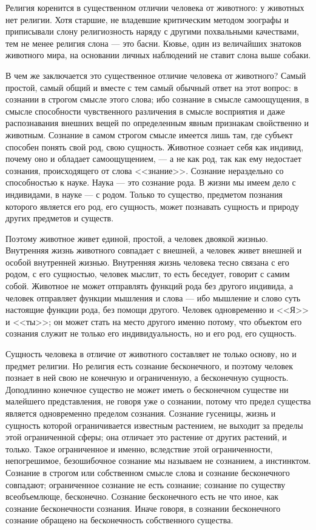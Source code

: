 \documentclass[12pt,oneside]{book}
\begin{document}
Религия коренится в существенном отличии человека от животного: у животных нет религии. Хотя старшие, не владевшие критическим методом зоографы и приписывали слону религиозность наряду с другими похвальными качествами, тем не менее религия слона --- это басни. Кювье, один из величайших знатоков животного мира, на основании личных наблюдений не ставит слона выше собаки.

В чем же заключается это существенное отличие человека от животного? Самый простой, самый общий и вместе с тем самый обычный ответ на этот вопрос: в сознании в строгом смысле этого слова; ибо сознание в смысле самоощущения, в смысле способности чувственного различения в смысле восприятия и даже распознавания внешних вещей по определенным явным признакам свойственно и животным. Сознание в самом строгом смысле имеется лишь там, где субъект способен понять свой род, свою сущность. Животное сознает себя как индивид, почему оно и обладает самоощущением, --- а не как род, так как ему недостает сознания, происходящего от слова <<знание>>. Сознание нераздельно со способностью к науке. Наука --- это сознание рода. В жизни мы имеем дело с индивидами, в науке --- с родом. Только то существо, предметом познания которого является его род, его сущность, может познавать сущность и природу других предметов и существ.

Поэтому животное живет единой, простой, а человек двоякой жизнью. Внутренняя жизнь животного совпадает с внешней, а человек живет внешней и особой внутренней жизнью. Внутренняя жизнь человека тесно связана с его родом, с его сущностью, человек мыслит, то есть беседует, говорит с самим собой. Животное не может отправлять функций рода без другого индивида, а человек отправляет функции мышления и слова --- ибо мышление и слово суть настоящие функции рода, без помощи другого. Человек одновременно и <<Я>> и <<ты>>; он может стать на место другого именно потому, что объектом его сознания служит не только его индивидуальность, но и его род, его сущность.

Сущность человека в отличие от животного составляет не только основу, но и предмет религии. Но религия есть сознание бесконечного, и поэтому человек познает в ней свою не конечную и ограниченную, а бесконечную сущность. Доподлинно конечное существо не может иметь о бесконечном существе ни малейшего представления, не говоря уже о сознании, потому что предел существа является одновременно пределом сознания. Сознание гусеницы, жизнь и сущность которой ограничивается известным растением, не выходит за пределы этой ограниченной сферы; она отличает это растение от других растений, и только. Такое ограниченное и именно, вследствие этой ограниченности, непогрешимое, безошибочное сознание мы называем не сознанием, а инстинктом. Сознание в строгом или собственном смысле слова и сознание бесконечного совпадают; ограниченное сознание не есть сознание; сознание по существу всеобъемлюще, бесконечно. Сознание бесконечного есть не что иное, как сознание бесконечности сознания. Иначе говоря, в сознании бесконечного сознание обращено на бесконечность собственного существа.
\end{document}
